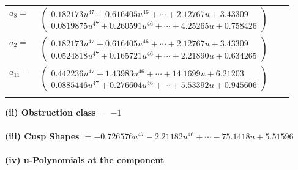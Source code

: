 \documentclass[1p]{elsarticle_modified}
\theoremstyle{definition}
\begin{document}
\begin{tabular}{m{7pt} m{180pt} m{7pt} m{180pt} }
\flushright $a_{8}=$&$\begin{pmatrix}0.182173 u^{47}+0.616405 u^{46}+\cdots+2.12767 u+3.43309\\0.0819875 u^{47}+0.260591 u^{46}+\cdots+4.25265 u+0.758426\end{pmatrix}$ \\
\flushright $a_{2}=$&$\begin{pmatrix}0.182173 u^{47}+0.616405 u^{46}+\cdots+2.12767 u+3.43309\\0.0524818 u^{47}+0.165721 u^{46}+\cdots+2.21890 u+0.634265\end{pmatrix}$ \\
\flushright $a_{11}=$&$\begin{pmatrix}0.442236 u^{47}+1.43983 u^{46}+\cdots+14.1699 u+6.21203\\0.0885446 u^{47}+0.276604 u^{46}+\cdots+5.53392 u+0.945606\end{pmatrix}$\\&\end{tabular}
\flushleft \textbf{(ii) Obstruction class $= -1$}\\~\\
\flushleft \textbf{(iii) Cusp Shapes $= -0.726576 u^{47}-2.21182 u^{46}+\cdots-75.1418 u+5.51596$}\\~\\
\newpage\renewcommand{\arraystretch}{1}
\flushleft \textbf{(iv) u-Polynomials at the component}\newline \\
\end{document}
